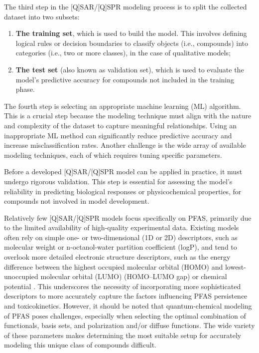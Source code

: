 The third step in the [Q]SAR/[Q]SPR modeling process is to split the collected dataset into two subsets:

\begin{enumerate}
    \item \textbf{The training set}, which is used to build the model. This involves defining logical rules or decision boundaries to classify objects (i.e., compounds) into categories (i.e., two or more classes), in the case of qualitative models;
    \item \textbf{The test set} (also known as validation set), which is used to evaluate the model’s predictive accuracy for compounds not included in the training phase.
\end{enumerate}

The fourth step is selecting an appropriate machine learning (ML) algorithm. This is a crucial step because the modeling technique must align with the nature and complexity of the dataset to capture meaningful relationships. Using an inappropriate ML method can significantly reduce predictive accuracy and increase misclassification rates. Another challenge is the wide array of available modeling techniques, each of which requires tuning specific parameters.

Before a developed [Q]SAR/[Q]SPR model can be applied in practice, it must undergo rigorous validation. This step is essential for assessing the model’s reliability in predicting biological responses or physicochemical properties, for compounds not involved in model development. \cite{NevesB}\cite{Jaganathan}\cite{Polishchuk}

Relatively few [Q]SAR/[Q]SPR models focus specifically on PFAS, primarily due to the limited availability of high-quality experimental data. Existing models often rely on simple one- or two-dimensional (1D or 2D) descriptors, such as molecular weight or n-octanol-water partition coefficient (logP), and tend to overlook more detailed electronic structure descriptors, such as the energy difference between the highest occupied molecular orbital (HOMO) and lowest-unoccupied molecular orbital (LUMO) (HOMO–LUMO gap) or chemical potential \cite{BlakeFenton2020, Gkika2023}. This underscores the necessity of incorporating more sophisticated descriptors to more accurately capture the factors influencing PFAS persistence and toxicokinetics. However, it should be noted that quantum-chemical modeling of PFAS poses challenges, especially when selecting the optimal combination of functionals, basis sets, and polarization and/or diffuse functions. The wide variety of these parameters makes determining the most suitable setup for accurately modeling this unique class of compounds difficult.

